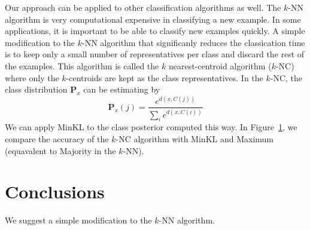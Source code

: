 \documentclass{article}
\begin{document}
Our approach can be applied to other classification algorithms as
well. The $k$-NN algorithm is very computational expensive in
classifying a new example. In some applications, it is important to be
able to classify new examples quickly. A simple modification to the
$k$-NN algorithm that significanly reduces the classication time is to
keep only a small number of representatives per class and discard the
rest of the examples. This algorithm is called the $k$
nearest-centroid algorithm ($k$-NC) where only the $k$-centroids are
kept as the class representatives. In the $k$-NC, the class
distribution $\mathbf{P}_x$ can be estimating by
\[
\mathbf{P}_x(j) = \frac{e^{d(x,C(j))}}{\sum_i e^{d(x, C(i))} }
\]
We can apply MinKL to the class posterior computed this
way. In Figure~\ref{}, we compare the accuracy of the $k$-NC algorithm
with MinKL and Maximum (equavalent to Majority in the $k$-NN).

\section{Conclusions}

We suggest a simple modification to the $k$-NN algorithm.



\end{document}
